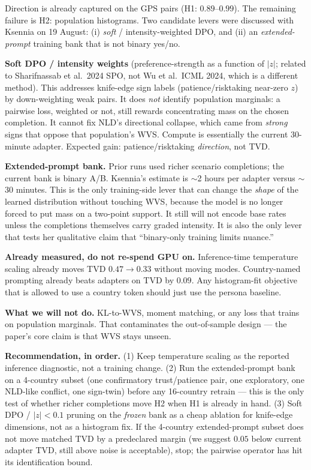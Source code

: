 \documentclass[11pt]{article}
\begin{document}
Direction is already captured on the GPS pairs (H1: $0.89$--$0.99$). The remaining failure is H2: population histograms. Two candidate levers were discussed with Ksennia on 19 August: (i) \emph{soft} / intensity-weighted DPO, and (ii) an \emph{extended-prompt} training bank that is not binary yes/no.

\textbf{Soft DPO / intensity weights} (preference-strength as a function of $|z|$; related to Sharifnassab et al.\ 2024 SPO, not Wu et al.\ ICML 2024, which is a different method). This addresses knife-edge sign labels (patience/risktaking near-zero $z$) by down-weighting weak pairs. It does \emph{not} identify population marginals: a pairwise loss, weighted or not, still rewards concentrating mass on the chosen completion. It cannot fix NLD's directional collapse, which came from \emph{strong} signs that oppose that population's WVS. Compute is essentially the current 30-minute adapter. Expected gain: patience/risktaking \emph{direction}, not TVD.

\textbf{Extended-prompt bank.} Prior runs used richer scenario completions; the current bank is binary A/B. Ksennia's estimate is $\sim$2 hours per adapter versus $\sim$30 minutes. This is the only training-side lever that can change the \emph{shape} of the learned distribution without touching WVS, because the model is no longer forced to put mass on a two-point support. It still will not encode base rates unless the completions themselves carry graded intensity. It is also the only lever that tests her qualitative claim that ``binary-only training limits nuance.''

\textbf{Already measured, do not re-spend GPU on.} Inference-time temperature scaling already moves TVD $0.47\to 0.33$ without moving modes. Country-named prompting already beats adapters on TVD by $0.09$. Any histogram-fit objective that is allowed to use a country token should just use the persona baseline.

\textbf{What we will not do.} KL-to-WVS, moment matching, or any loss that trains on population marginals. That contaminates the out-of-sample design --- the paper's core claim is that WVS stays unseen.

\textbf{Recommendation, in order.} (1) Keep temperature scaling as the reported inference diagnostic, not a training change. (2) Run the extended-prompt bank on a 4-country subset (one confirmatory trust/patience pair, one exploratory, one NLD-like conflict, one sign-twin) before any 16-country retrain --- this is the only test of whether richer completions move H2 when H1 is already in hand. (3) Soft DPO / $|z|<0.1$ pruning on the \emph{frozen} bank as a cheap ablation for knife-edge dimensions, not as a histogram fix. If the 4-country extended-prompt subset does not move matched TVD by a predeclared margin (we suggest $0.05$ below current adapter TVD, still above noise is acceptable), stop; the pairwise operator has hit its identification bound.
\end{document}
